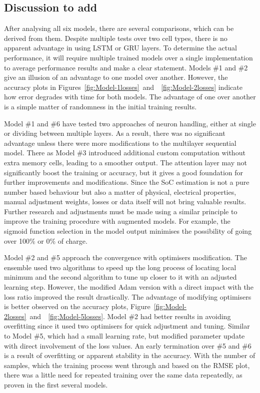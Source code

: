 %
%
\subsection{Discussion to add}
After analysing all six models, there are several comparisons, which can be derived from them.
Despite multiple tests over two cell types, there is no apparent advantage in using LSTM or GRU layers.
To determine the actual performance, it will require multiple trained models over a single implementation to average performance results and make a clear statement.
Models \#1 and \#2 give an illusion of an advantage to one model over another.
However, the accuracy plots in \mbox{Figures~\ref{fig:Model-1losses} and ~\ref{fig:Model-2losses}} indicate how error degrades with time for both models.
The advantage of one over another is a simple matter of randomness in the initial training results.

%
%
Model \#1 and \#6 have tested two approaches of neuron handling, either at single or dividing between multiple layers.
As a result, there was no significant advantage unless there were more modifications to the multilayer sequential model.
There as Model \#3 introduced additional custom computation without extra memory cells, leading to a smoother output.
The attention layer may not significantly boost the training or accuracy, but it gives a good foundation for further improvements and modifications.
Since the SoC estimation is not a pure number based behaviour but also a matter of physical, electrical properties, manual adjustment weights, losses or data itself will not bring valuable results.
Further research and adjustments must be made using a similar principle to improve the training procedure with augmented models. 
For example, the sigmoid function selection in the model output minimises the possibility of going over 100\% or 0\% of charge.

%
%
Model \#2 and \#5 approach the convergence with optimisers modification.
The ensemble used two algorithms to speed up the long process of locating local minimum and the second algorithm to tune up closer to it with an adjusted learning step.
However, the modified Adam version with a direct impact with the loss ratio improved the result drastically.
The advantage of modifying optimisers is better observed on the accuracy plots, \mbox{Figure~\ref{fig:Model-2losses} and ~\ref{fig:Model-5losses}}.
Model \#2 had better results in avoiding overfitting since it used two optimisers for quick adjustment and tuning.
Similar to Model \#5, which had a small learning rate, but modified parameter update with direct involvement of the loss values.
An early termination over \#5 and \#6 is a result of overfitting or apparent stability in the accuracy.
With the number of samples, which the training process went through and based on the RMSE plot, there was a little need for repeated training over the same data repeatedly, as proven in the first several models.

